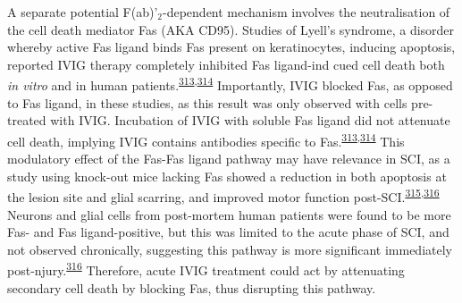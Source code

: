 \documentclass[
]{article}
\begin{document}
A separate potential F(ab)'\(_2\)-dependent mechanism involves the neutralisation of the cell death mediator Fas (AKA CD95).
Studies of Lyell's syndrome, a disorder whereby active Fas ligand binds Fas present on keratinocytes, inducing apoptosis, reported IVIG therapy completely inhibited Fas ligand-ind cued cell death both \emph{in vitro} and in human patients.\textsuperscript{\protect\hyperlink{ref-viard_inhibition_1998}{313},\protect\hyperlink{ref-altznauer_concurrent_2003}{314}}
Importantly, IVIG blocked Fas, as opposed to Fas ligand, in these studies, as this result was only observed with cells pre-treated with IVIG.
Incubation of IVIG with soluble Fas ligand did not attenuate cell death, implying IVIG contains antibodies specific to Fas.\textsuperscript{\protect\hyperlink{ref-viard_inhibition_1998}{313},\protect\hyperlink{ref-altznauer_concurrent_2003}{314}}
This modulatory effect of the Fas-Fas ligand pathway may have relevance in SCI, as a study using knock-out mice lacking Fas showed a reduction in both apoptosis at the lesion site and glial scarring, and improved motor function post-SCI.\textsuperscript{\protect\hyperlink{ref-sobrido-camean_role_2018}{315},\protect\hyperlink{ref-yu_fasfasl-mediated_2011}{316}}
Neurons and glial cells from post-mortem human patients were found to be more Fas- and Fas ligand-positive, but this was limited to the acute phase of SCI, and not observed chronically, suggesting this pathway is more significant immediately post-njury.\textsuperscript{\protect\hyperlink{ref-yu_fasfasl-mediated_2011}{316}}
Therefore, acute IVIG treatment could act by attenuating secondary cell death by blocking Fas, thus disrupting this pathway.
\end{document}
